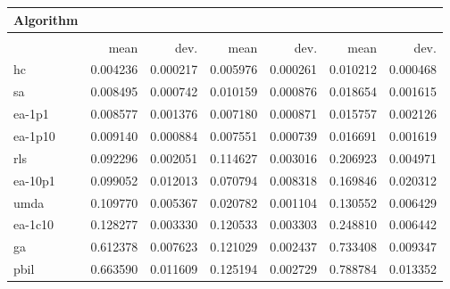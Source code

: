 \begin{tabular}{@{} l *{6}{>{{}}N{1}{2}} @{}}
\toprule
{Algorithm} &  \\
\midrule
&  &  &  \\
\midrule
& {mean} & {dev.} & {mean} & {dev.} & {mean} & {dev.} \\
\midrule
hc & 0.004236 & 0.000217 & 0.005976 & 0.000261 & 0.010212 & 0.000468 \\
sa & 0.008495 & 0.000742 & 0.010159 & 0.000876 & 0.018654 & 0.001615 \\
ea-1p1 & 0.008577 & 0.001376 & 0.007180 & 0.000871 & 0.015757 & 0.002126 \\
ea-1p10 & 0.009140 & 0.000884 & 0.007551 & 0.000739 & 0.016691 & 0.001619 \\
rls & 0.092296 & 0.002051 & 0.114627 & 0.003016 & 0.206923 & 0.004971 \\
ea-10p1 & 0.099052 & 0.012013 & 0.070794 & 0.008318 & 0.169846 & 0.020312 \\
umda & 0.109770 & 0.005367 & 0.020782 & 0.001104 & 0.130552 & 0.006429 \\
ea-1c10 & 0.128277 & 0.003330 & 0.120533 & 0.003303 & 0.248810 & 0.006442 \\
ga & 0.612378 & 0.007623 & 0.121029 & 0.002437 & 0.733408 & 0.009347 \\
pbil & 0.663590 & 0.011609 & 0.125194 & 0.002729 & 0.788784 & 0.013352 \\
\bottomrule
\end{tabular}
